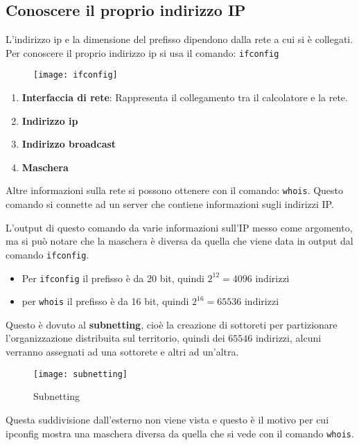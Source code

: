 \documentclass[a4paper]{article}
\begin{document}
\subsection{Conoscere il proprio indirizzo IP}
L'indirizzo ip e la dimensione del prefisso dipendono dalla rete a cui si è collegati.
Per conoscere il proprio indirizzo ip si usa il comando: \texttt{ifconfig}
\begin{figure}[H]
  \centering
  \texttt{[image: ifconfig]}
\end{figure}
\begin{enumerate}
  \item \textbf{Interfaccia di rete}: Rappresenta il collegamento tra il calcolatore e
    la rete.
  \item \textbf{Indirizzo ip}
  \item \textbf{Indirizzo broadcast}
  \item \textbf{Maschera}
\end{enumerate}

\vspace{1em}
\noindent
Altre informazioni sulla rete si possono ottenere con il comando: \texttt{whois}.
Questo comando si connette ad un server che contiene informazioni sugli indirizzi IP.

\noindent
L'output di questo comando da varie informazioni sull'IP messo come argomento, ma si
può notare che la maschera è diversa da quella che viene data in output dal comando
\texttt{ifconfig}.

\begin{itemize}
  \item Per \texttt{ifconfig} il prefisso è da 20 bit, quindi \( 2^{12} = 4096 \) indirizzi
  \item per \texttt{whois} il prefisso è da 16 bit, quindi \( 2^{16} = 65536 \) indirizzi
\end{itemize}

\noindent
Questo è dovuto al \textbf{subnetting}, cioè la creazione di sottoreti per partizionare
l'organizzazione distribuita sul territorio, quindi dei \( 65546 \) indirizzi, alcuni
verranno assegnati ad una sottorete e altri ad un'altra.
\begin{figure}[H]
  \centering
  \texttt{[image: subnetting]}
  \caption{Subnetting}
\end{figure}
\noindent
Questa suddivisione dall'esterno non viene vista e questo è il motivo per cui ipconfig
mostra una maschera diversa da quella che si vede con il comando \texttt{whois}.
\end{document}
